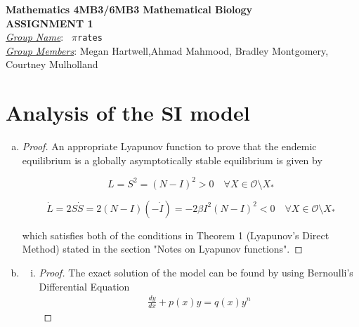 \documentclass[12pt]{article}
\begin{document}
\begin{center}
{\bfseries Mathematics 4MB3/6MB3 Mathematical Biology\\
 ASSIGNMENT {\color{blue}1}}\\
\medskip
\underline{\emph{Group Name}}: \texttt{{\color{blue} $\pi$rates}}\\
\medskip
\underline{\emph{Group Members}}: {\color{blue} Megan Hartwell,Ahmad Mahmood, Bradley Montgomery, Courtney Mulholland}
\end{center}

\section{Analysis of the SI model}

\SIanalIntro
\begin{enumerate}[(a)]
\item \SIanalQa
  
  {\color{blue}
    \begin{proof}
	      An appropriate Lyapunov function to prove that the endemic equilibrium is a globally asymptotically stable equilibrium is given by 
	      
	      \begin{equation}
	      	L=S^2=(N-I)^2 > 0 \quad \forall X\in\mathcal{O}\setminus{X_*}
	      \end{equation}
	      
	       \begin{equation}
	      	\dot{L}=2S\dot{S}=2(N-I)(-\dot{I})=-2\beta I^2 (N-I)^2  < 0 \quad \forall X\in\mathcal{O}\setminus{X_*}
	      \end{equation}
	      
	      which satisfies both of the conditions in Theorem 1 (Lyapunov's Direct Method) stated in the section "Notes on Lyapunov functions".

    \end{proof}
  }
  
\item \SIanalQb
  \begin{enumerate}[(i)]
  \item \SIanalQbi
    
    {\color{blue}
      \begin{proof}
	       
	       The exact solution of the model can be found by using Bernoulli's Differential Equation
	       \begin{equation}
	       {\displaystyle {\begin{aligned}
	       \frac{dy}{dx}+p(x)y=q(x)y^n
	       \end{aligned}}}
	       \end{equation}
	       

\end{proof}}
\end{enumerate}
\end{enumerate}
\end{document}
